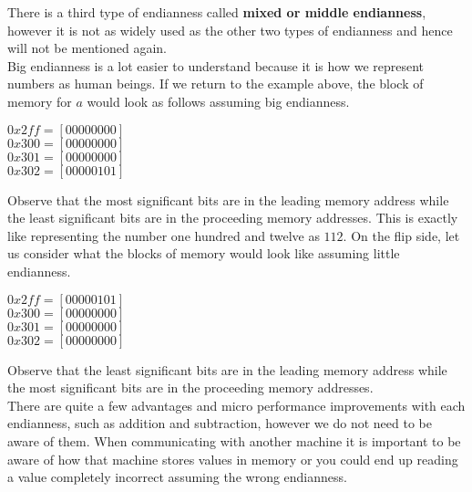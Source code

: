
There is a third type of endianness called \textbf{mixed or middle endianness}, however it is not as widely used as the other two types of endianness and hence will not be mentioned again.\\

Big endianness is a lot easier to understand because it is how we represent numbers as human beings. If we return to the example above, the block of memory for $a$ would look as follows assuming big endianness.\\

\begin{center}
$0x2ff = [ 0 0 0 0 0 0 0 0 ]$\\
$0x300 = [ 0 0 0 0 0 0 0 0 ]$\\
$0x301 = [ 0 0 0 0 0 0 0 0 ]$\\
$0x302 = [ 0 0 0 0 0 1 0 1 ]$\\
\end{center}

Observe that the most significant bits are in the leading memory address while the least significant bits are in the proceeding memory addresses. This is exactly like representing the number one hundred and twelve as $112$. On the flip side, let us consider what the blocks of memory would look like assuming little endianness.\\

\begin{center}
$0x2ff = [ 0 0 0 0 0 1 0 1 ]$\\
$0x300 = [ 0 0 0 0 0 0 0 0 ]$\\
$0x301 = [ 0 0 0 0 0 0 0 0 ]$\\
$0x302 = [ 0 0 0 0 0 0 0 0 ]$\\
\end{center}

Observe that the least significant bits are in the leading memory address while the most significant bits are in the proceeding memory addresses.\\

There are quite a few advantages and micro performance improvements with each endianness, such as addition and subtraction, however we do not need to be aware of them. When communicating with another machine it is important to be aware of how that machine stores values in memory or you could end up reading a value completely incorrect assuming the wrong endianness.\\

